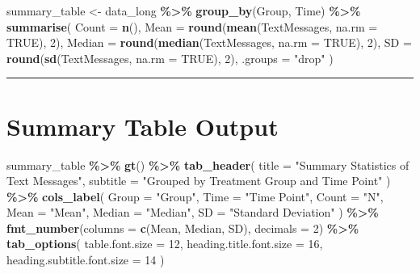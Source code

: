 \documentclass[
]{article}
\newenvironment{Shaded}{\begin{snugshade}}{\end{snugshade}}
\newcommand{\AttributeTok}[1]{\textcolor[rgb]{0.13,0.29,0.53}{#1}}
\newcommand{\ConstantTok}[1]{\textcolor[rgb]{0.56,0.35,0.01}{#1}}
\newcommand{\DecValTok}[1]{\textcolor[rgb]{0.00,0.00,0.81}{#1}}
\newcommand{\FunctionTok}[1]{\textcolor[rgb]{0.13,0.29,0.53}{\textbf{#1}}}
\newcommand{\NormalTok}[1]{#1}
\newcommand{\OtherTok}[1]{\textcolor[rgb]{0.56,0.35,0.01}{#1}}
\newcommand{\SpecialCharTok}[1]{\textcolor[rgb]{0.81,0.36,0.00}{\textbf{#1}}}
\newcommand{\StringTok}[1]{\textcolor[rgb]{0.31,0.60,0.02}{#1}}
\begin{document}
\begin{Shaded}
\begin{Highlighting}[]
\NormalTok{summary\_table }\OtherTok{\textless{}{-}}\NormalTok{ data\_long }\SpecialCharTok{\%\textgreater{}\%}
  \FunctionTok{group\_by}\NormalTok{(Group, Time) }\SpecialCharTok{\%\textgreater{}\%}
  \FunctionTok{summarise}\NormalTok{(}
    \AttributeTok{Count =} \FunctionTok{n}\NormalTok{(),}
    \AttributeTok{Mean =} \FunctionTok{round}\NormalTok{(}\FunctionTok{mean}\NormalTok{(TextMessages, }\AttributeTok{na.rm =} \ConstantTok{TRUE}\NormalTok{), }\DecValTok{2}\NormalTok{),}
    \AttributeTok{Median =} \FunctionTok{round}\NormalTok{(}\FunctionTok{median}\NormalTok{(TextMessages, }\AttributeTok{na.rm =} \ConstantTok{TRUE}\NormalTok{), }\DecValTok{2}\NormalTok{),}
    \AttributeTok{SD =} \FunctionTok{round}\NormalTok{(}\FunctionTok{sd}\NormalTok{(TextMessages, }\AttributeTok{na.rm =} \ConstantTok{TRUE}\NormalTok{), }\DecValTok{2}\NormalTok{),}
    \AttributeTok{.groups =} \StringTok{"drop"}
\NormalTok{  )}
\end{Highlighting}
\end{Shaded}

\begin{center}\rule{0.5\linewidth}{0.5pt}\end{center}

\section{Summary Table Output}\label{summary-table-output}

\begin{Shaded}
\begin{Highlighting}[]
\NormalTok{summary\_table }\SpecialCharTok{\%\textgreater{}\%}
  \FunctionTok{gt}\NormalTok{() }\SpecialCharTok{\%\textgreater{}\%}
  \FunctionTok{tab\_header}\NormalTok{(}
    \AttributeTok{title =} \StringTok{"Summary Statistics of Text Messages"}\NormalTok{,}
    \AttributeTok{subtitle =} \StringTok{"Grouped by Treatment Group and Time Point"}
\NormalTok{  ) }\SpecialCharTok{\%\textgreater{}\%}
  \FunctionTok{cols\_label}\NormalTok{(}
    \AttributeTok{Group =} \StringTok{"Group"}\NormalTok{,}
    \AttributeTok{Time =} \StringTok{"Time Point"}\NormalTok{,}
    \AttributeTok{Count =} \StringTok{"N"}\NormalTok{,}
    \AttributeTok{Mean =} \StringTok{"Mean"}\NormalTok{,}
    \AttributeTok{Median =} \StringTok{"Median"}\NormalTok{,}
    \AttributeTok{SD =} \StringTok{"Standard Deviation"}
\NormalTok{  ) }\SpecialCharTok{\%\textgreater{}\%}
  \FunctionTok{fmt\_number}\NormalTok{(}\AttributeTok{columns =} \FunctionTok{c}\NormalTok{(Mean, Median, SD), }\AttributeTok{decimals =} \DecValTok{2}\NormalTok{) }\SpecialCharTok{\%\textgreater{}\%}
  \FunctionTok{tab\_options}\NormalTok{(}
    \AttributeTok{table.font.size =} \DecValTok{12}\NormalTok{,}
    \AttributeTok{heading.title.font.size =} \DecValTok{16}\NormalTok{,}
    \AttributeTok{heading.subtitle.font.size =} \DecValTok{14}
\NormalTok{  )}
\end{Highlighting}
\end{Shaded}
\end{document}
